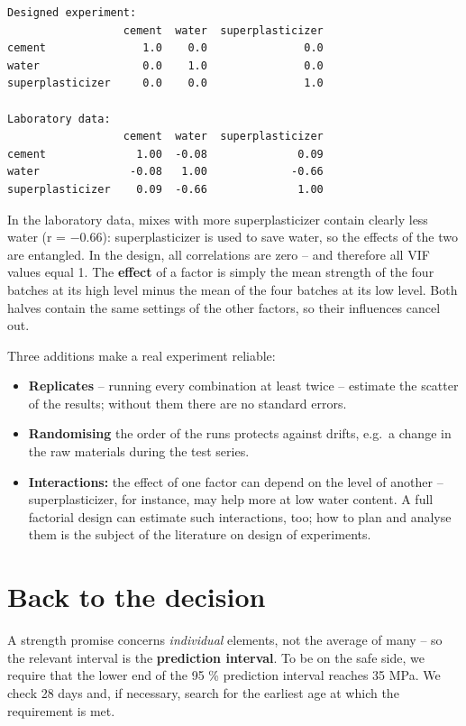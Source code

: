 \documentclass[
  letterpaper,
  DIV=11,
  numbers=noendperiod]{scrreprt}
\providecommand{\tightlist}{%
  \setlength{\itemsep}{0pt}\setlength{\parskip}{0pt}}\usepackage{longtable,booktabs,array}
\begin{document}
\begin{verbatim}
Designed experiment:
                  cement  water  superplasticizer
cement               1.0    0.0               0.0
water                0.0    1.0               0.0
superplasticizer     0.0    0.0               1.0

Laboratory data:
                  cement  water  superplasticizer
cement              1.00  -0.08              0.09
water              -0.08   1.00             -0.66
superplasticizer    0.09  -0.66              1.00
\end{verbatim}

In the laboratory data, mixes with more superplasticizer contain clearly
less water (r = −0.66): superplasticizer is used to save water, so the
effects of the two are entangled. In the design, all correlations are
zero -- and therefore all VIF values equal 1. The \textbf{effect} of a
factor is simply the mean strength of the four batches at its high level
minus the mean of the four batches at its low level. Both halves contain
the same settings of the other factors, so their influences cancel out.

Three additions make a real experiment reliable:

\begin{itemize}
\tightlist
\item
  \textbf{Replicates} -- running every combination at least twice --
  estimate the scatter of the results; without them there are no
  standard errors.
\item
  \textbf{Randomising} the order of the runs protects against drifts,
  e.g.~a change in the raw materials during the test series.
\item
  \textbf{Interactions:} the effect of one factor can depend on the
  level of another -- superplasticizer, for instance, may help more at
  low water content. A full factorial design can estimate such
  interactions, too; how to plan and analyse them is the subject of the
  literature on design of experiments.
\end{itemize}

\section{Back to the decision}\label{back-to-the-decision-4}

A strength promise concerns \emph{individual} elements, not the average
of many -- so the relevant interval is the \textbf{prediction interval}.
To be on the safe side, we require that the lower end of the 95 \%
prediction interval reaches 35 MPa. We check 28 days and, if necessary,
search for the earliest age at which the requirement is met.
\end{document}
